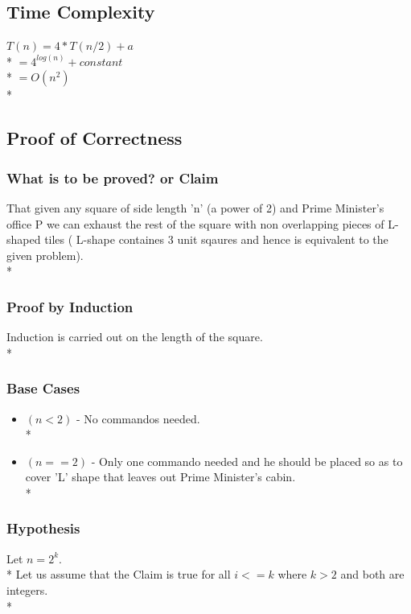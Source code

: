 \documentclass{article}
\begin{document}
\begin{itemize}
\subsection{Time Complexity}
\begin{center}
$ T(n) = 4*T(n/2) + a $ \\*
$ = 4^{log(n)} + constant $ \\*
$ = O(n^2) $ \\*
\end{center}
\subsection{Proof of Correctness}
\subsubsection{What is to be proved? or Claim}
That given any square of side length 'n' (a power of 2)  and Prime Minister's office P we can exhaust the rest of the square with non overlapping pieces of L-shaped tiles ( L-shape containes 3 unit sqaures and hence is equivalent to the given problem).  \\*
\subsubsection{Proof by Induction}
Induction is carried out on the length of the square. \\*
\subsubsection{Base Cases}
\begin{itemize}
\item $(n<2)$ - No commandos needed. \\*
\item $(n==2)$ - Only one commando needed and he should be placed so as to cover 'L' shape that leaves out Prime Minister's cabin. \\*
\end{itemize}
\subsubsection{Hypothesis}
Let $ n = 2^{k} $. \\*
Let us assume that the Claim is true for all $i<=k$ where $k>2$ and both are integers. \\*

\end{itemize}
\end{document}
